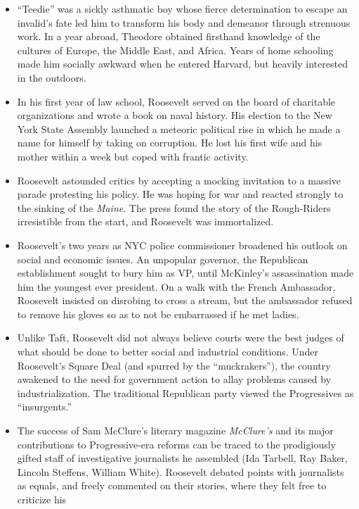 \documentclass[
]{article}
\begin{document}
\begin{itemize}
\item
  ``Teedie'' was a sickly asthmatic boy whose fierce determination to
  escape an invalid's fate led him to transform his body and demeanor
  through strenuous work. In a year abroad, Theodore obtained firsthand
  knowledge of the cultures of Europe, the Middle East, and Africa.
  Years of home schooling made him socially awkward when he entered
  Harvard, but heavily interested in the outdoors.
\item
  In his first year of law school, Roosevelt served on the board of
  charitable organizations and wrote a book on naval history. His
  election to the New York State Assembly launched a meteoric political
  rise in which he made a name for himself by taking on corruption. He
  lost his first wife and his mother within a week but coped with
  frantic activity.
\item
  Roosevelt astounded critics by accepting a mocking invitation to a
  massive parade protesting his policy. He was hoping for war and
  reacted strongly to the sinking of the \emph{Maine}. The press found
  the story of the Rough-Riders irresistible from the start, and
  Roosevelt was immortalized.
\item
  Roosevelt's two years as NYC police commissioner broadened his outlook
  on social and economic issues. An unpopular governor, the Republican
  establishment sought to bury him as VP, until McKinley's assassination
  made him the youngest ever president. On a walk with the French
  Ambassador, Roosevelt insisted on disrobing to cross a stream, but the
  ambassador refused to remove his gloves so as to not be embarrassed if
  he met ladies.
\item
  Unlike Taft, Roosevelt did not always believe courts were the best
  judges of what should be done to better social and industrial
  conditions. Under Roosevelt's Square Deal (and spurred by the
  ``muckrakers''), the country awakened to the need for government
  action to allay problems caused by industrialization. The traditional
  Republican party viewed the Progressives as ``insurgents.''
\item
  The success of Sam McClure's literary magazine \emph{McClure's} and
  its major contributions to Progressive-era reforms can be traced to
  the prodigiously gifted staff of investigative journalists he
  assembled (Ida Tarbell, Ray Baker, Lincoln Steffens, William White).
  Roosevelt debated points with journalists as equals, and freely
  commented on their stories, where they felt free to criticize his

\end{itemize}
\end{document}
